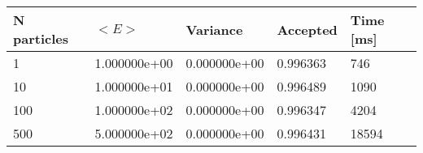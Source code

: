 \begin{table}[h!]
\begin{tabular}{|l|l|l|l|l|}
\hline 
N particles & $<E>$ & Variance & Accepted & Time [ms]\\ 
 \hline 
1 & 1.000000e+00 & 0.000000e+00 & 0.996363 & 746 \\ \hline 
10 & 1.000000e+01 & 0.000000e+00 & 0.996489 & 1090 \\ \hline 
100 & 1.000000e+02 & 0.000000e+00 & 0.996347 & 4204 \\ \hline 
500 & 5.000000e+02 & 0.000000e+00 & 0.996431 & 18594 \\ \hline 
\end{tabular}
\label{i:a2} 
\end{table}
